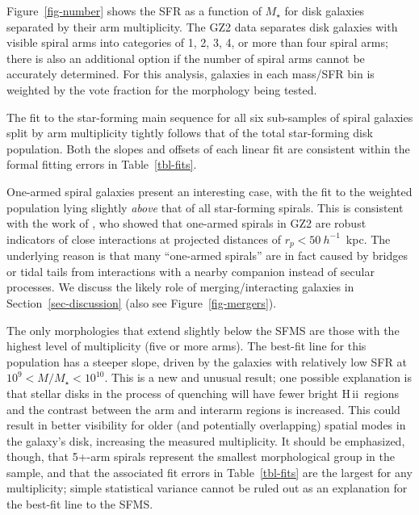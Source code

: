 \documentclass[useAMS,usenatbib]{mn2e}
\def\rr{\color{titlecol}}
\begin{document}
Figure~\ref{fig-number} shows the SFR as a function of $M_\star$ for disk galaxies separated by their arm multiplicity. The GZ2 data separates disk galaxies with visible spiral arms into categories of 1, 2, 3, 4, or more than four spiral arms; there is also an additional option if the number of spiral arms cannot be accurately determined. For this analysis, galaxies in each mass/SFR bin is weighted by the vote fraction for the morphology being tested. {\rr The fit to the star-forming main sequence for all six sub-samples of spiral galaxies split by arm multiplicity tightly follows that of the total star-forming disk population. Both the slopes and offsets of each linear fit are consistent within the formal fitting errors in Table~\ref{tbl-fits}. %

One-armed spiral galaxies present an interesting case, with the fit to the weighted population lying slightly \emph{above} that of all star-forming spirals. This is consistent with the work of \citet{cas13}, who showed that one-armed spirals in GZ2 are robust indicators of close interactions at projected distances of $r_p < 50~h^{-1}$~kpc. The underlying reason is that many ``one-armed spirals'' are in fact caused by bridges or tidal tails from interactions with a nearby companion instead of secular processes. We discuss the likely role of merging/interacting galaxies in Section~\ref{sec-discussion} (also see Figure~\ref{fig-mergers}).

The only morphologies that extend slightly below the SFMS are those with the highest level of multiplicity (five or more arms). The best-fit line for this population has a steeper slope, driven by the galaxies with relatively low SFR at $10^9<M/M_\star<10^{10}$. This is a new and unusual result; one possible explanation is that stellar disks in the process of quenching will have fewer bright \mbox{H\,{\sc ii}}~regions and the contrast between the arm and interarm regions is increased. This could result in better visibility for older (and potentially overlapping) spatial modes in the galaxy's disk, increasing the measured multiplicity. It should be emphasized, though, that 5+-arm spirals represent the smallest morphological group in the sample, and that the associated fit errors in Table~\ref{tbl-fits} are the largest for any multiplicity; simple statistical variance cannot be ruled out as an explanation for the best-fit line to the SFMS.

}
\end{document}
